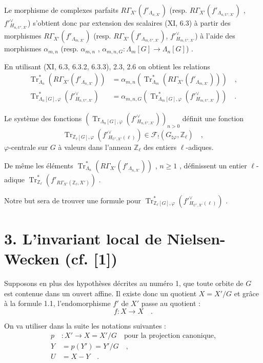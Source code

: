 \documentclass[11pt]{article}
\providecommand{\Tr}{\operatorname{Tr}}
\providecommand{\Tr}{\operatorname{Tr}}
\providecommand{\Tr}{\operatorname{Tr}}
\providecommand{\Tr}{\operatorname{Tr}}
\providecommand{\La}{\Lambda}
\providecommand{\bZ}{\mathbb Z}
\providecommand{\Tr}{\operatorname{Tr}}
\begin{document}
Le morphisme de complexes parfaits $R\Gamma_{X'}(f'_{\La_{n,X'}})$ (resp. $R\Gamma_{X'}(f'_{\La_{n,U',X'}})$ , $f'^\vee_{H_{n,U',X'}}$) s'obtient donc par extension des scalaires (XI, 6.3) à partir des morphismes $R\Gamma_{X'}(f'_{\La_{m,X'}})$ (resp. $R\Gamma_{X'}(f'_{\La_{m,U',X'}})$, $f'^\vee_{H_{m,U',X'}}$) à l'aide des morphismes $\alpha_{m,n}$ (resp. $\alpha_{m,n}$ , $\alpha_{m,n,G} : \La_m[G] \longrightarrow \La_n[G]$) .

En utilisant (XI, 6.3, 6.3.2, 6.3.3), 2.3, 2.6 on obtient les relations
\begin{align}
\tag{2.7} \Tr^*_{\La_n}(R\Gamma_{X'}(f'_{\La_{n,X'}})) &= \alpha_{m,n}(\Tr^*_{\La_m}(R\Gamma_{X'}(f'_{\La_{m,X'}}))) \quad , \\
\tag{2.8} \Tr^*_{\La_n[G],\varphi}(f'^\vee_{H_{n,U',X'}}) &= \alpha_{m,n,G}(\Tr^*_{\La_m[G],\varphi}(f'^\vee_{H_{m,U',X'}})) \quad .
\end{align}

Le système des fonctions $(\Tr_{\La_n[G],\varphi}(f'^\vee_{H_{n,U',X'}}))_{n>0}$ définit une fonction
\[
\Tr_{\bZ_\ell[G],\varphi}(f'^\vee_{H_{U',X'}(\ell)}) \in \mathcal{F}_!(G_{\natural\varphi}, \bZ_\ell) \quad ,
\]
$\varphi$-centrale sur $G$ à valeurs dans l'anneau $\bZ_\ell$ des entiers $\ell$-adiques.

De même les éléments $\Tr^*_{\La_n}(R\Gamma_{X'}(f'_{\La_{n,X'}}))$ , $n \geq 1$ , définissent un entier $\ell$-adique $\Tr^*_{\bZ_\ell}(f'_{R\Gamma_{X'}(\bZ_\ell,X')})$ .

Notre but sera de trouver une formule pour $\Tr^*_{\bZ_\ell[G],\varphi}(f'^\vee_{H_{U',X'}(\ell)})$ .


\section*{3. L'invariant local de Nielsen-Wecken (cf. [1])}
Supposons en plus des hypothèses décrites au numéro 1, que toute orbite de $G$ est contenue dans un ouvert affine. Il existe donc un quotient $X = X'/G$ et grâce à la formule 1.1, l'endomorphisme $f'$ de $X'$ passe au quotient :
\[
f : X \longrightarrow X \quad .
\]

On va utiliser dans la suite les notations suivantes :
\begin{align*}
p &: X' \longrightarrow X = X'/G \quad \text{pour la projection canonique,} \\
Y &= p(Y') = Y'/G \quad , \\
U &= X - Y \quad .
\end{align*}
\end{document}
